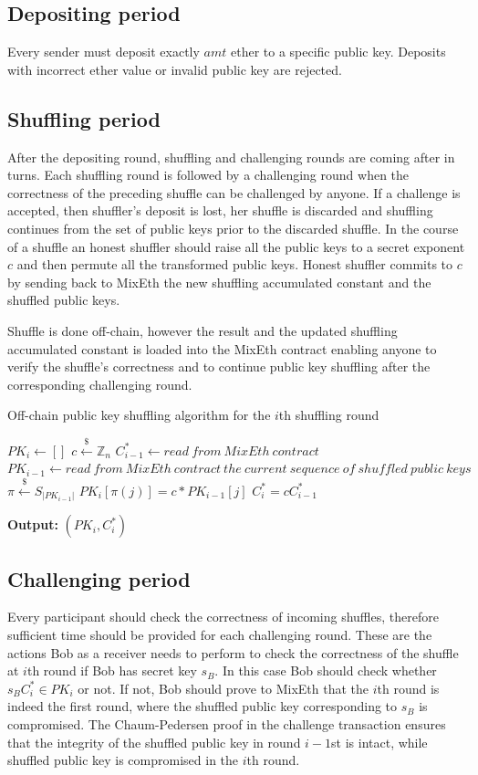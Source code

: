 \documentclass[a4paper]{article}
\theoremstyle{definition}
\begin{document}
\subsection{Depositing period}
Every sender must deposit exactly $amt$ ether to a specific public key. Deposits with incorrect ether value or invalid public key are rejected.  
\subsection{Shuffling period}
After the depositing round, shuffling and challenging rounds are coming after in turns. Each shuffling round is followed by a challenging round when the correctness of the preceding shuffle can be challenged by anyone. If a challenge is accepted, then shuffler's deposit is lost, her shuffle is discarded and shuffling continues from the set of public keys prior to the discarded shuffle. In the course of a shuffle an honest shuffler should raise all the public keys to a secret exponent $c$ and then permute all the transformed public keys. Honest shuffler commits to $c$ by sending back to MixEth the new shuffling accumulated constant and the shuffled public keys.

Shuffle is done off-chain, however the result and the updated shuffling accumulated constant is loaded into the MixEth contract enabling anyone to verify the shuffle's correctness and to continue public key shuffling after the corresponding challenging round.

\begin{algorithm}
\caption{Off-chain public key shuffling algorithm for the $i$th shuffling round}\label{shufflingoffchain}
\begin{algorithmic}[1]
	\State $PK_{i} \gets []$
	\State $c\stackrel{\$}{\leftarrow}\mathbb{Z}_n$
	\State $C^{*}_{i-1}\leftarrow read\ from\ MixEth\ contract$
	\State $PK_{i-1}\leftarrow read\ from\ MixEth\ contract\ the\ current\ sequence\ of\ shuffled\ public\ keys$
	\State $\pi\stackrel{\$}{\leftarrow}S_{|PK_{i-1}|}$ 
	\State $PK_{i}[\pi(j)]=c*PK_{i-1}[j]$ 
	\EndFor
	\State $C^{*}_{i}=cC^{*}_{i-1}$
	
\hspace*{\algorithmicindent} \textbf{Output:} $(PK_{i},C^{*}_{i})$ 
\end{algorithmic}   
\end{algorithm}
\subsection{Challenging period}
Every participant should check the correctness of incoming shuffles, therefore sufficient time should be provided for each challenging round. These are the actions Bob as a receiver needs to perform to check the correctness of the shuffle at $i$th round if Bob has secret key $s_{B}$. In this case Bob should check whether $s_{B}C^{*}_{i} \in PK_{i}$ or not. If not, Bob should prove to MixEth that the $i$th round is indeed the first round, where the shuffled public key corresponding to $s_{B}$ is compromised. The Chaum-Pedersen proof in the challenge transaction ensures that the integrity of the shuffled public key in round $i-1$st is intact, while shuffled public key is compromised in the $i$th round.   
\end{document}
